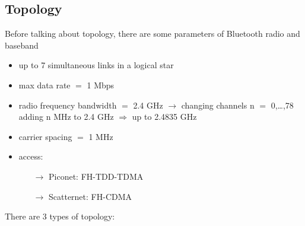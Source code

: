 \subsection{Topology}
Before talking about topology, there are some parameters of Bluetooth radio and baseband
\begin{itemize}
    \item up to 7 simultaneous links in a logical star
    \item max data rate $=$ 1 Mbps
    \item radio frequency bandwidth $=$ 2.4 GHz $\rightarrow$ changing channels n $=$ 0,\dots,78\\
    adding n MHz to 2.4 GHz $\Rightarrow$ up to 2.4835 GHz
    \item carrier spacing $=$ 1 MHz
    \item access:
    \begin{itemize}
        \item[$\rightarrow$] Piconet: FH-TDD-TDMA
        \item[$\rightarrow$] Scatternet: FH-CDMA
    \end{itemize}
\end{itemize}
There are 3 types of topology:
